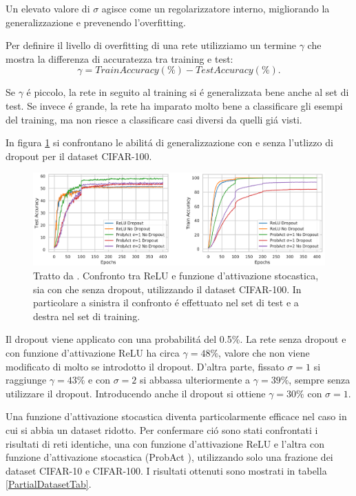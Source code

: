 \documentclass[a4paper,12pt]{report}
\begin{document}
  Un elevato valore di $\sigma$ agisce come un regolarizzatore interno, migliorando la generalizzazione e prevenendo l'overfitting. 
  
  Per definire il livello di overfitting di una rete utilizziamo un termine $\gamma$ che mostra la differenza di accuratezza tra training e test:
  \begin{equation}
   \gamma = TrainAccuracy(\%) - TestAccuracy(\%).
  \end{equation}
  
  Se $\gamma$ \'e piccolo, la rete in seguito al training si \'e generalizzata bene anche al set di test. 
  Se invece \'e grande, la rete ha imparato molto bene a classificare gli esempi del training, ma non riesce a classificare casi diversi da quelli gi\'a visti. 
  
  In figura \ref{WithWithoutDropoutpng} si confrontano le abilit\'a di generalizzazione con e senza l'utlizzo di dropout per il dataset CIFAR-100. 
  \begin{figure}[h!]
   \centering
   \includegraphics[width=\linewidth]{WithWithoutDropout.png} 
   \caption{Tratto da \cite{lee2019probact}. Confronto tra ReLU e funzione d'attivazione stocastica, sia con che senza dropout, utilizzando il dataset CIFAR-100. In particolare a sinistra il confronto \'e effettuato nel set di test e a destra nel set di training.}
  \label{WithWithoutDropoutpng}
  \end{figure} 
  
  
  Il dropout viene applicato con una probabilit\'a del 0.5\%. 
  La rete senza dropout e con funzione d'attivazione ReLU ha circa $\gamma = 48\%$, valore che non viene modificato di molto se introdotto il dropout. 
  D'altra parte, fissato $\sigma = 1$ si raggiunge $\gamma = 43\%$ e con $\sigma = 2$ si abbassa ulteriormente a $\gamma = 39\%$, sempre senza utilizzare il dropout. 
  Introducendo anche il dropout si ottiene $\gamma = 30\%$ con $\sigma = 1$.
  
  Una funzione d'attivazione stocastica diventa particolarmente efficace nel caso in cui si abbia un dataset ridotto. 
  Per confermare ci\'o sono stati confrontati i risultati di reti identiche, una con funzione d'attivazione ReLU e l'altra con funzione d'attivazione stocastica (ProbAct \cite{lee2019probact}), utilizzando solo una frazione dei dataset CIFAR-10 e CIFAR-100. 
  I risultati ottenuti sono mostrati in tabella \ref{PartialDatasetTab}.
  
\end{document}
